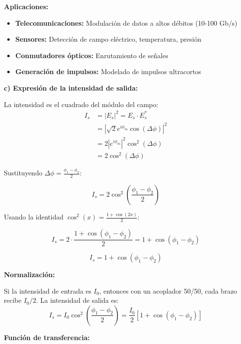 \documentclass[12pt,a4paper]{article}
\begin{document}
\textbf{Aplicaciones:}

\begin{itemize}
    \item \textbf{Telecomunicaciones:} Modulación de datos a altos débitos (10-100 Gb/s)
    \item \textbf{Sensores:} Detección de campo eléctrico, temperatura, presión
    \item \textbf{Conmutadores ópticos:} Enrutamiento de señales
    \item \textbf{Generación de impulsos:} Modelado de impulsos ultracortos
\end{itemize}

\textbf{c) Expresión de la intensidad de salida:}

La intensidad es el cuadrado del módulo del campo:
\begin{align}
    I_s &= |E_s|^2 = E_s \cdot E_s^* \\
    &= \left|\sqrt{2} e^{i\phi_m} \cos(\Delta\phi)\right|^2 \\
    &= 2|e^{i\phi_m}|^2 \cos^2(\Delta\phi) \\
    &= 2\cos^2(\Delta\phi)
\end{align}

Sustituyendo $\Delta\phi = \frac{\phi_1 - \phi_2}{2}$:

\begin{equation}
    \boxed{I_s = 2\cos^2\left(\frac{\phi_1 - \phi_2}{2}\right)}
\end{equation}

Usando la identidad $\cos^2(x) = \frac{1 + \cos(2x)}{2}$:

\begin{equation}
    I_s = 2 \cdot \frac{1 + \cos(\phi_1 - \phi_2)}{2} = 1 + \cos(\phi_1 - \phi_2)
\end{equation}

\begin{equation}
    \boxed{I_s = 1 + \cos(\phi_1 - \phi_2)}
\end{equation}

\textbf{Normalización:}

Si la intensidad de entrada es $I_0$, entonces con un acoplador 50/50, cada brazo recibe $I_0/2$. La intensidad de salida es:
\begin{equation}
    I_s = I_0 \cos^2\left(\frac{\phi_1 - \phi_2}{2}\right) = \frac{I_0}{2}\left[1 + \cos(\phi_1 - \phi_2)\right]
\end{equation}

\textbf{Función de transferencia:}
\end{document}

